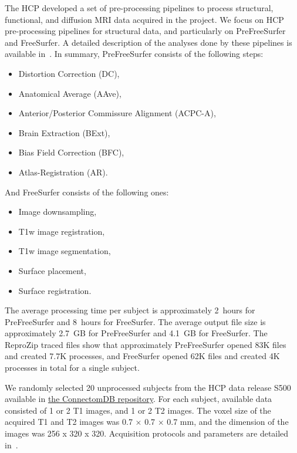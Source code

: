 \documentclass[a4paper,num-refs]{oup-contemporary}
\newcommand{\reprozip}[0]{ReproZip\xspace}
\newcommand{\tristan}[1]{\color{blue}\textbf{From Tristan:}#1\color{black}}
\begin{document}
The HCP developed a set of pre-processing pipelines to process structural,
functional, and diffusion MRI data acquired in the project. We focus on HCP
pre-processing pipelines for structural data, and particularly
on PreFreeSurfer and FreeSurfer. 
A detailed description of the analyses done by these
pipelines is available in~\cite{glasser2013}. 
In summary, PreFreeSurfer consists of the following steps: 
\begin{itemize}
\item Distortion Correction (DC), 
\item Anatomical Average (AAve), 
\item Anterior/Posterior Commissure Alignment (ACPC-A), 
\item Brain Extraction (BExt), 
\item Bias Field Correction (BFC), 
\item Atlas-Registration (AR).
\end{itemize}
And FreeSurfer consists of the following ones:
\begin{itemize}
\item Image downsampling, 
\item T1w image registration, 
\item T1w image segmentation,
\item Surface placement, 
\item Surface registration.
\end{itemize}
The average processing time per subject is approximately 2~hours for
PreFreeSurfer and 8~hours for FreeSurfer. The average output file size is
approximately 2.7~GB for PreFreeSurfer and 4.1~GB for FreeSurfer.
The \reprozip traced files show that approximately PreFreeSurfer opened  
83K files and created 7.7K processes, and FreeSurfer opened 62K files and 
created 4K processes in total for a single subject.

We randomly selected 20 unprocessed subjects 
from the HCP data release S500 
available in \href{https://db.humanconnectome.org}{the ConnectomDB repository}. 
For each subject, available data consisted of 1 or 2 T1 images, and 1 or 2 T2 images. 
The voxel size of the acquired T1 and T2 images was 0.7 × 0.7 × 0.7 mm, 
and the dimension of the images was 256 x 320 x 320.
Acquisition protocols and parameters are detailed in~\cite{van2013wu}. 
\end{document}
